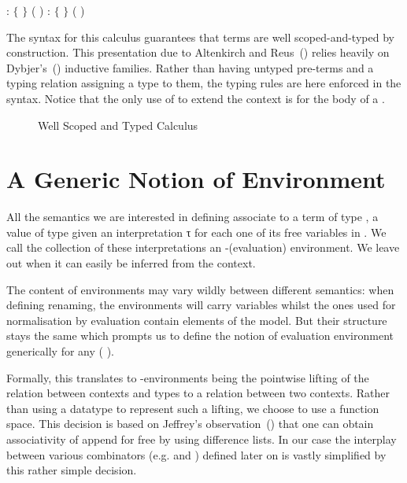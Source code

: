 \begin{center}
   : { $\lbrace$ $\rbrace$ 
              ( \AIC{::} )}
  \qquad
   : { $\lbrace$  $\rbrace$ 
                  ( \AIC{::} )}
\end{center}

The syntax for this calculus guarantees that terms are well scoped-and-typed
by construction. This presentation due to
Altenkirch and Reus~(\citeyear{altenkirch1999monadic}) relies heavily on
Dybjer's~(\citeyear{dybjer1991inductive}) inductive families. Rather than
having untyped pre-terms and a typing relation assigning a type to
them, the typing rules are here enforced in the syntax. Notice that
the only use of  to extend the context is for the body of
a .

\begin{figure}[h]
\caption{Well Scoped and Typed Calculus\label{fig:term}}
\end{figure}

\section{A Generic Notion of Environment}

All the semantics we are interested in defining associate to a term 
of type   , a value of type    given
an interpretation   {τ} for each one of its free variables
 in . We call the collection of these interpretations an
-(evaluation) environment. We leave out  when it can easily
be inferred from the context.

The content of environments may vary wildly between different semantics:
when defining renaming, the environments will carry variables whilst the
ones used for normalisation by evaluation contain elements of the model.
But their structure stays the same which prompts us to define the notion
of evaluation environment generically for any ( ).

Formally, this translates to -environments being the
pointwise lifting of the relation  between contexts and types to a
relation between two contexts. Rather than using a datatype to represent
such a lifting, we choose to use a function space. This decision is based
on Jeffrey's observation~(\citeyear{jeffrey2011assoc}) that one can obtain
associativity of append for free by using difference lists. In our case the
interplay between various combinators (e.g.  and )
defined later on is vastly simplified by this rather simple decision.

